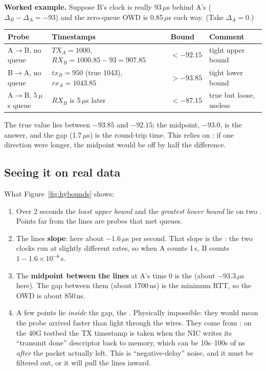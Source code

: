 \textbf{Worked example.} Suppose B's clock is really 93\,$\mu$s behind A's ($\Delta_B - \Delta_A = -93$) and the zero-queue OWD is 0.85\,$\mu$s
each way. (Take $\Delta_A = 0$.)
\begin{center}
\small
\begin{tabular}{@{}llll@{}}
\toprule
Probe & Timestamps & Bound & Comment\\
\midrule
A$\to$B, no queue & $TX_A = 1000$, $RX_B = 1000.85 - 93 = 907.85$ & $< -92.15$ & tight upper bound\\
B$\to$A, no queue & $tx_B = 950$ (true 1043), $rx_A = 1043.85$ & $> -93.85$ & tight lower bound\\
A$\to$B, 5\,$\mu$s queue & $RX_B$ is 5\,$\mu$s later & $< -87.15$ & true but loose, useless\\
\bottomrule
\end{tabular}
\end{center}
The true value lies between $-93.85$ and $-92.15$; the midpoint, $-93.0$, is the answer, and the gap (1.7\,$\mu$s) is the round-trip time.
This relies on : if one direction were longer, the midpoint would be off by half the difference.

\subsection{Seeing it on real data}


What Figure~\ref{fig:hybounds} shows:
\begin{enumerate}
  \item Over 2 seconds the \emph{least upper bound} and the \emph{greatest lower bound} lie on two . Points far
        from the lines are probes that met queues.
  \item The lines \textbf{slope}: here about $-1.6\,\mu$s per second. That slope is the : the two clocks run at slightly different
        rates, so when A counts 1\,s, B counts $1 - 1.6\times10^{-6}$\,s.
  \item The \textbf{midpoint between the lines} at A's time 0 is the  (about $-93.3\,\mu$s here). The gap between them (about 1700\,ns) is the
        minimum RTT, so the OWD is about 850\,ns.
  \item A few points lie \emph{inside} the gap, the . Physically impossible: they would mean the probe arrived faster than light
        through the wires. They come from : on the 40G testbed the TX timestamp is taken when the NIC writes its ``transmit
        done'' descriptor back to memory, which can be 10s--100s of ns \emph{after} the packet actually left. This is ``negative-delay'' noise, and it
        must be filtered out, or it will pull the lines inward.
\end{enumerate}

